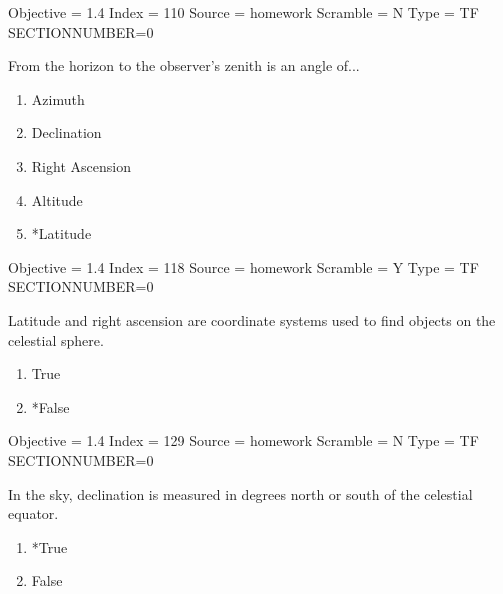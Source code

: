 \documentclass[11pt]{article}
\begin{document}
\begin{enumerate}
\begin{minipage}{\textwidth}
\begin{minipage}{\textwidth}
Objective = 1.4
Index = 110
Source = homework
Scramble = N
Type = TF
SECTIONNUMBER=0
\end{minipage}
\end{minipage}
\vskip 0.20in

\begin{minipage}{\textwidth}
\begin{minipage}{\textwidth}
\item From the horizon to the observer's zenith is an angle of...
\begin{multicols}{3}
\begin{enumerate} 
\setlength{\itemsep}{1pt} 
\setlength{\parskip}{0pt} 
\setlength{\parsep}{0pt}
\setlength{\multicolsep}{1pt} 
\item Azimuth
\item Declination
\item Right Ascension
\item Altitude
\item *Latitude
\end{enumerate} 
\vfill 
\end{multicols}

Objective = 1.4
Index = 118
Source = homework
Scramble = Y
Type = TF
SECTIONNUMBER=0
\end{minipage}
\end{minipage}
\vskip 0.20in

\begin{minipage}{\textwidth}
\begin{minipage}{\textwidth}
\item Latitude and right ascension are coordinate systems used to find objects on the celestial sphere.
\begin{multicols}{3}
\begin{enumerate} 
\setlength{\itemsep}{1pt} 
\setlength{\parskip}{0pt} 
\setlength{\parsep}{0pt}
\setlength{\multicolsep}{1pt} 
\item True
\item *False
\end{enumerate} 
\vfill 
\end{multicols}

Objective = 1.4
Index = 129
Source = homework
Scramble = N
Type = TF
SECTIONNUMBER=0
\end{minipage}
\end{minipage}
\vskip 0.20in

\begin{minipage}{\textwidth}
\begin{minipage}{\textwidth}
\item In the sky, declination is measured in degrees north or south of the celestial equator.
\begin{multicols}{3}
\begin{enumerate} 
\setlength{\itemsep}{1pt} 
\setlength{\parskip}{0pt} 
\setlength{\parsep}{0pt}
\setlength{\multicolsep}{1pt} 
\item *True
\item False
\end{enumerate} 
\vfill 
\end{multicols}


\end{minipage}
\end{minipage}
\end{enumerate}
\end{document}
